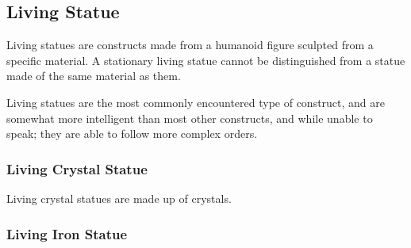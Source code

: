 \begin{multicols*}{2}
\subsection{Living Statue}
Living statues are constructs made from a humanoid figure sculpted from a specific material. A stationary living statue cannot be distinguished from a statue made of the same material as them.

Living statues are the most commonly encountered type of construct, and are somewhat more intelligent than most other constructs, and while unable to speak; they are able to follow more complex orders.

\subsubsection{Living Crystal Statue}

Living crystal statues are made up of crystals.

\subsubsection{Living Iron Statue}
\end{multicols*}
